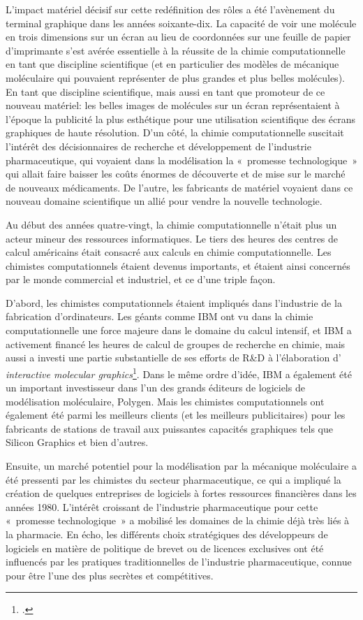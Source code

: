 \documentclass{FramateX}
\begin{document}
\begin{refsection}
L'impact matériel décisif sur cette redéfinition des
rôles a été l'avènement du terminal graphique dans les
années soixante-dix. La capacité de voir une molécule en trois
dimensions sur un écran au lieu de coordonnées sur une feuille de
papier d'imprimante s'est avérée
essentielle à la réussite de la chimie computationnelle en tant que
discipline scientifique (et en particulier des modèles de mécanique
moléculaire qui pouvaient représenter de plus grandes et plus belles
molécules). En tant que discipline scientifique, mais aussi en tant que
promoteur de ce nouveau matériel: les belles images de molécules sur
un écran représentaient à l'époque la publicité la
plus esthétique pour une utilisation scientifique des écrans graphiques
de haute résolution. D'un côté, la chimie
computationnelle suscitait l'intérêt des
décisionnaires de recherche et développement de
l'industrie pharmaceutique, qui voyaient dans la
modélisation la «~promesse technologique~» qui allait faire baisser les
coûts énormes de découverte et de mise sur le marché de nouveaux
médicaments. De l'autre, les fabricants de matériel
voyaient dans ce nouveau domaine scientifique un allié pour vendre la
nouvelle technologie.

Au début des années quatre-vingt, la chimie computationnelle
n'était plus un acteur mineur des ressources
informatiques. Le tiers des heures des centres de calcul américains
était consacré aux calculs en chimie computationnelle. Les chimistes
computationnels étaient devenus importants, et étaient ainsi concernés
par le monde commercial et industriel, et ce d'une
triple façon.

D'abord, les chimistes computationnels étaient
impliqués dans l'industrie de la fabrication
d'ordinateurs. Les géants comme IBM ont vu dans la
chimie computationnelle une force majeure dans le domaine du calcul
intensif, et IBM a activement financé les heures de calcul de groupes
de recherche en chimie, mais aussi a investi une partie substantielle
de ses efforts de R\&D à l'élaboration
d' \textit{interactive molecular graphics}\footnote{\cite{Francoeur2004}.}. Dans le même ordre
d'idée, IBM a également été un important investisseur
dans l'un des grands éditeurs de logiciels de
modélisation moléculaire, Polygen. Mais les chimistes computationnels
ont également été parmi les meilleurs clients (et les meilleurs
publicitaires) pour les fabricants de stations de travail aux
puissantes capacités graphiques tels que Silicon Graphics et bien
d'autres.

Ensuite, un marché potentiel pour la modélisation par la mécanique
moléculaire a été pressenti par les chimistes du secteur
pharmaceutique, ce qui a impliqué la création de quelques entreprises
de logiciels à fortes ressources financières dans les années 1980.
L'intérêt croissant de l'industrie
pharmaceutique pour cette «~promesse technologique~» a mobilisé les
domaines de la chimie déjà très liés à la pharmacie. En écho, les
différents choix stratégiques des développeurs de logiciels en matière
de politique de brevet ou de licences exclusives ont été influencés par
les pratiques traditionnelles de l'industrie
pharmaceutique, connue pour être l'une des plus
secrètes et compétitives.


\end{refsection}
\end{document}
